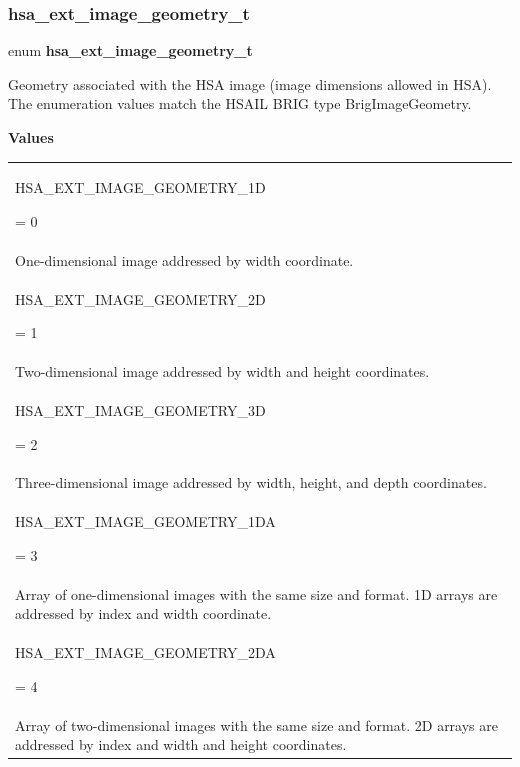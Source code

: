 \documentclass[final]{book}
\newcommand{\reftyp}[1]{#1}
\newcommand{\refenu}[1]{\reftyp{#1}}
\newenvironment{mylongtable}{\rowcolors{0}{lightgray}{lightgray}\longtable} {
\endlongtable}
\begin{document}
\subsubsection{hsa_\-ext_\-image_\-geometry_\-t}
\vspace{-5.5mm}\begin{mylongtable}{@{}p{\textwidth}}
\rule{0pt}{3ex}\rule[-2.5ex]{0pt}{0pt}enum \hypertarget{group__images_1gac61587d98a80d1660378e3904a66fc9c}{\textbf{hsa_\-ext_\-image_\-geometry_\-t}}
\end{mylongtable}
\vspace{-2mm}Geometry associated with the HSA image (image dimensions allowed in HSA). The enumeration values match the HSAIL BRIG type BrigImageGeometry.

\noindent\textbf{Values}\\[-5mm]
\begin{longtable}{@{\hspace{2em}}p{\linewidth-2em}}
\hspace{-2em}\hypertarget{group__images_1ggac61587d98a80d1660378e3904a66fc9caa025ea993dbfe3101d3ff0caea2ea0cf}{\refenu{HSA_\-EXT_\-IMAGE_\-GEOMETRY_\-1D}} = 0\\One-dimensional image addressed by width coordinate.\\[2mm]
\hspace{-2em}\hypertarget{group__images_1ggac61587d98a80d1660378e3904a66fc9ca4bcc28ccad5a32bd9c9dbf203da4464e}{\refenu{HSA_\-EXT_\-IMAGE_\-GEOMETRY_\-2D}} = 1\\Two-dimensional image addressed by width and height coordinates.\\[2mm]
\hspace{-2em}\hypertarget{group__images_1ggac61587d98a80d1660378e3904a66fc9ca2e749b6b96377b9a744fc837296e318c}{\refenu{HSA_\-EXT_\-IMAGE_\-GEOMETRY_\-3D}} = 2\\Three-dimensional image addressed by width, height, and depth coordinates.\\[2mm]
\hspace{-2em}\hypertarget{group__images_1ggac61587d98a80d1660378e3904a66fc9cad989c8e619b376dc98ac3950be9afa33}{\refenu{HSA_\-EXT_\-IMAGE_\-GEOMETRY_\-1DA}} = 3\\Array of one-dimensional images with the same size and format. 1D arrays are addressed by index and width coordinate.\\[2mm]
\hspace{-2em}\hypertarget{group__images_1ggac61587d98a80d1660378e3904a66fc9ca90929e69cbf0b447060e1aeb23fd6dd4}{\refenu{HSA_\-EXT_\-IMAGE_\-GEOMETRY_\-2DA}} = 4\\Array of two-dimensional images with the same size and format. 2D arrays are addressed by index and width and height coordinates.\\[2mm]

\end{longtable}
\end{document}

